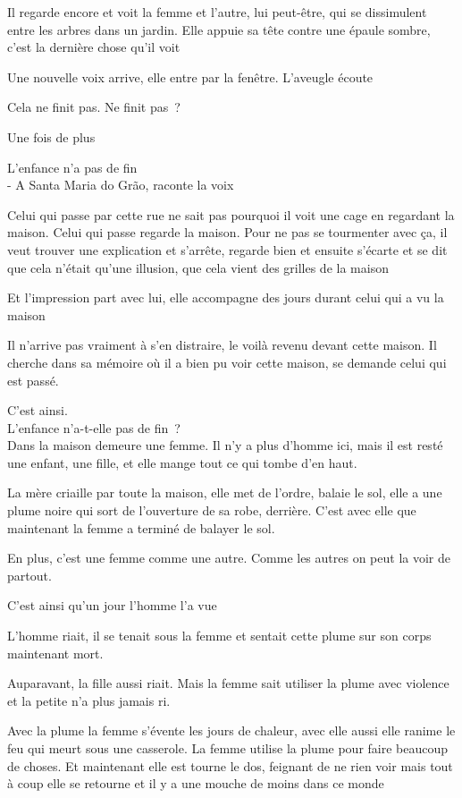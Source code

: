Il regarde encore et voit la femme et l'autre, lui peut-être, qui se
dissimulent entre les arbres dans un jardin. Elle appuie sa tête contre
une épaule sombre, c'est la dernière chose qu'il voit

\pagebreak

Une nouvelle voix arrive, elle entre par la fenêtre. L'aveugle écoute

Cela ne finit pas. Ne finit pas~?

Une fois de plus

L'enfance n'a pas de fin\\

- A Santa Maria do Grão, raconte la voix

Celui qui passe par cette rue ne sait pas pourquoi il voit une cage en
regardant la maison. Celui qui passe regarde la maison. Pour ne pas se
tourmenter avec ça, il veut trouver une explication et s'arrête, regarde
bien et ensuite s'écarte et se dit que cela n'était qu'une illusion, que
cela vient des grilles de la maison

Et l'impression part avec lui, elle accompagne des jours durant celui
qui a vu la maison

Il n'arrive pas vraiment à s'en distraire, le voilà revenu devant cette
maison. Il cherche dans sa mémoire où il a bien pu voir cette maison, se
demande celui qui est passé.

C'est ainsi.\\

L'enfance n'a-t-elle pas de fin~?\\

Dans la maison demeure une femme. Il n'y a plus d'homme ici, mais il est
resté une enfant, une fille, et elle mange tout ce qui tombe d'en haut.

La mère criaille par toute la maison, elle met de l'ordre, balaie le
sol, elle a une plume noire qui sort de l'ouverture de sa robe,
derrière. C'est avec elle que maintenant la femme a terminé de balayer
le sol.

En plus, c'est une femme comme une autre. Comme les autres on peut la
voir de partout.

C'est ainsi qu'un jour l'homme l'a vue

L'homme riait, il se tenait sous la femme et sentait cette plume sur son
corps maintenant mort.

Auparavant, la fille aussi riait. Mais la femme sait utiliser la plume
avec violence et la petite n'a plus jamais ri.

Avec la plume la femme s'évente les jours de chaleur, avec elle aussi
elle ranime le feu qui meurt sous une casserole. La femme utilise la
plume pour faire beaucoup de choses. Et maintenant elle est tourne le
dos, feignant de ne rien voir mais tout à coup elle se retourne et il y
a une mouche de moins dans ce monde

